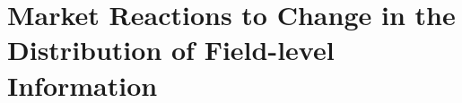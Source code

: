 \chapter{Market Reactions to Change in the Distribution of Field-level Information\label{theory}}


